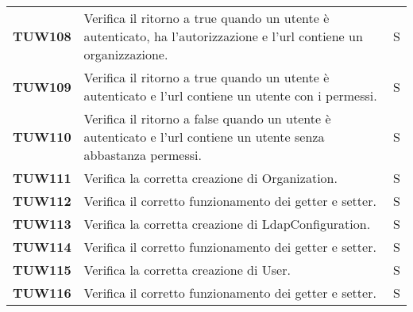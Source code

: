 \documentclass[../../piano-di-qualifica.tex]{subfiles}
\begin{document}
\begin{longtable}[H]{>{\centering\bfseries}m{3cm} >{}m{10cm} >{\centering\arraybackslash}m{3cm}}
  TUW108             & Verifica il ritorno a true quando un utente è autenticato, ha l'autorizzazione e l'url contiene un organizzazione.  & S                             \\

  TUW109             & Verifica il ritorno a true quando un utente è autenticato e l'url contiene un utente con i permessi.                & S                             \\

  TUW110             & Verifica il ritorno a false quando un utente è autenticato e l'url contiene un utente senza abbastanza permessi.    & S                             \\



  TUW111             & Verifica la corretta creazione di Organization.                                                                     & S                             \\

  TUW112             & Verifica il corretto funzionamento dei getter e setter.                                                             & S                             \\


  TUW113             & Verifica la corretta creazione di LdapConfiguration.                                                                & S                             \\

  TUW114             & Verifica il corretto funzionamento dei getter e setter.                                                             & S                             \\



  TUW115             & Verifica la corretta creazione di User.                                                                             & S                             \\

  TUW116             & Verifica il corretto funzionamento dei getter e setter.                                                             & S                             \\



\end{longtable}
\end{document}

